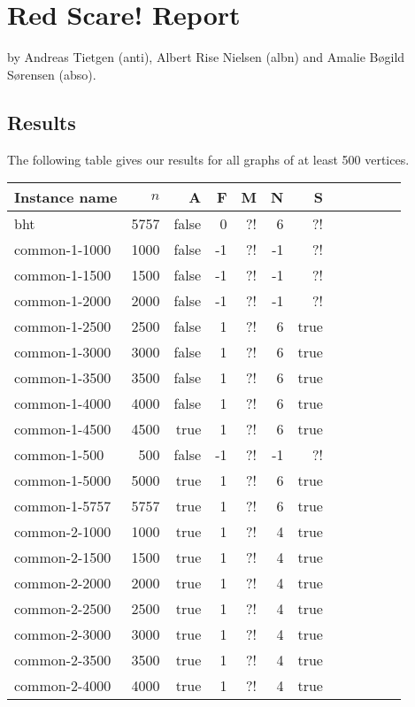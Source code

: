 \documentclass{tufte-handout}
\begin{document}
\section{Red Scare! Report}

by Andreas Tietgen (anti), Albert Rise Nielsen (albn) and Amalie Bøgild Sørensen (abso).

\subsection{Results}

The following table gives our results for all graphs of at least 500 vertices.

\medskip
\begin{longtable}{lrrrrrrrrrrr}
\toprule
	Instance name & $n$ & A & F & M & N & S\\
	\midrule
	bht & 5757 & false & 0 & ?! & 6 & ?!\\
	common-1-1000 & 1000 & false & -1 & ?! & -1 & ?!\\
	common-1-1500 & 1500 & false & -1 & ?! & -1 & ?!\\
	common-1-2000 & 2000 & false & -1 & ?! & -1 & ?!\\
	common-1-2500 & 2500 & false & 1 & ?! & 6 & true\\
	common-1-3000 & 3000 & false & 1 & ?! & 6 & true\\
	common-1-3500 & 3500 & false & 1 & ?! & 6 & true\\
	common-1-4000 & 4000 & false & 1 & ?! & 6 & true\\
	common-1-4500 & 4500 & true & 1 & ?! & 6 & true\\
	common-1-500 & 500 & false & -1 & ?! & -1 & ?!\\
	common-1-5000 & 5000 & true & 1 & ?! & 6 & true\\
	common-1-5757 & 5757 & true & 1 & ?! & 6 & true\\
	common-2-1000 & 1000 & true & 1 & ?! & 4 & true\\
	common-2-1500 & 1500 & true & 1 & ?! & 4 & true\\
	common-2-2000 & 2000 & true & 1 & ?! & 4 & true\\
	common-2-2500 & 2500 & true & 1 & ?! & 4 & true\\
	common-2-3000 & 3000 & true & 1 & ?! & 4 & true\\
	common-2-3500 & 3500 & true & 1 & ?! & 4 & true\\
	common-2-4000 & 4000 & true & 1 & ?! & 4 & true\\

\end{longtable}
\end{document}
